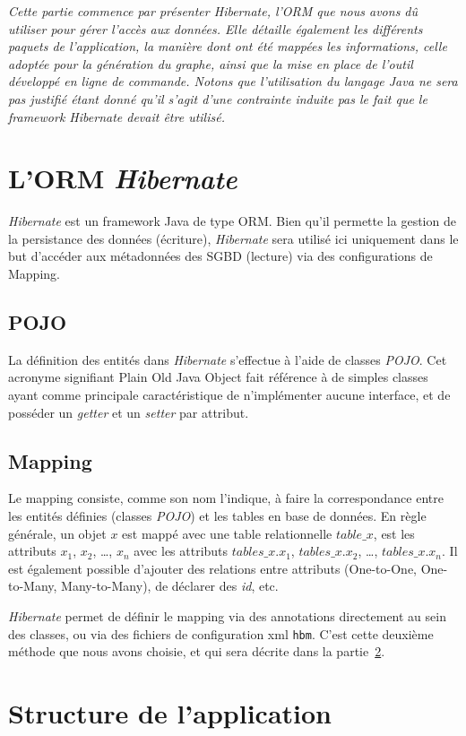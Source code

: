 \textit{Cette partie commence par présenter \emph{Hibernate}, l'ORM que nous avons dû utiliser pour gérer l'accès aux données. Elle détaille également les différents paquets de l'application, la manière dont ont été mappées les informations, celle adoptée pour la génération du graphe, ainsi que la mise en place de l'outil développé en ligne de commande. Notons que l'utilisation du langage Java ne sera pas justifié étant donné qu'il s'agit d'une contrainte induite pas le fait que le framework \emph{Hibernate} devait être utilisé.}

\section{L'ORM \emph{Hibernate}}
\emph{Hibernate} est un framework Java de type ORM. Bien qu'il permette la gestion de la persistance des données (écriture), \emph{Hibernate} sera utilisé ici uniquement dans le but d'accéder aux métadonnées des SGBD (lecture) via des configurations de Mapping.
\subsection{POJO}
La définition des entités dans \emph{Hibernate} s'effectue à l'aide de classes \emph{POJO}. Cet acronyme signifiant \og Plain Old Java Object \fg{} fait référence à de simples classes ayant comme principale caractéristique de n'implémenter aucune interface, et de posséder un \emph{getter} et un \emph{setter} par attribut.
\subsection{Mapping}
Le mapping consiste, comme son nom l'indique, à faire la correspondance entre les entités définies (classes \emph{POJO}) et les tables en base de données. En règle générale, un objet $x$ est mappé avec une table relationnelle $table\_x$, est les attributs $x_1$, $x_2$, \ldots, $x_n$ avec les attributs $tables\_x.x_1$, $tables\_x.x_2$, \ldots, $tables\_x.x_n$. Il est également possible d'ajouter des relations entre attributs (One-to-One, One-to-Many, Many-to-Many), de déclarer des \emph{id}, etc.

\emph{Hibernate} permet de définir le mapping via des annotations directement au sein des classes, ou via des fichiers de configuration xml \texttt{hbm}. C'est cette deuxième méthode que nous avons choisie, et qui sera décrite dans la partie~\ref{section:structure_de_lapplication}.

\section{Structure de l'application}
\label{section:structure_de_lapplication}

